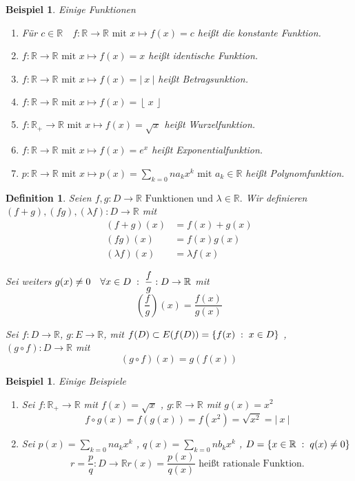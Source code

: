 \documentclass[a4paper,titlepage,oneside]{article}
\def\R{\ensuremath{\mathbb{R}} }
\def\sp{\hspace{0,1cm}}
\def\spcolon{\sp:\sp}
\newcommand{\abs}[1]{\ensuremath{\left|\:#1\:\right|}}
\newcommand{\floor}[1]{\ensuremath{\left\lfloor\:#1\:\right\rfloor}}
\newcommand{\menge}[2]{\ensuremath{\left\{#1\sp : \sp #2\right\}}}
\theoremstyle{thmstyle}
\newtheorem{defi}[satz]{Definition}
\newtheorem{bsp}[satz]{Beispiel}
\theoremstyle{subthmstyle}
\begin{document}
\begin{bsp}
Einige Funktionen
\begin{enumerate}
\item Für $ c \in \R \quad f : \R \to \R \text{ mit } x \mapsto f(x) = c $ heißt die konstante Funktion. %
\item $f : \R \to \R \text{ mit } x \mapsto f(x) = x $ heißt identische Funktion. %
\item $f : \R \to \R \text{ mit } x \mapsto f(x) = \abs{x} $ heißt Betragsunktion. %
\item $f : \R \to \R \text{ mit } x \mapsto f(x) = \floor{x} $ %
\item $f : \R_+ \to \R \text{ mit } x \mapsto f(x) = \sqrt{x} $ heißt Wurzelfunktion. %
\item $f : \R \to \R \text{ mit } x \mapsto f(x) = e^x $ heißt Exponentialfunktion. %
\item $p : \R \to \R \text{ mit } x \mapsto p(x) = \sum_{k=0}{n}{a_kx^k} \text{ mit } a_k \in \R $ heißt Polynomfunktion. %
\end{enumerate}
\end{bsp}

\begin{defi}
Seien \(f,g : D \to \R \text{ Funktionen und } \lambda \in \R.\) Wir definieren \((f+g), (fg), (\lambda f) : D \to \R \) mit
\begin{align*}
(f+g)(x) &= f(x) + g(x) \\
(fg)(x) &= f(x) g(x) \\
(\lambda f)(x) &= \lambda f(x)
\end{align*}

Sei weiters $\displaystyle g(x) \ne 0 \quad \forall x \in D \spcolon \frac{f}{g} : D \to \R $ mit
\[\left(\frac{f}{g}\right)(x) = \frac{f(x)}{g(x)}\]

Sei \( f: D \to \R\), \(g: E \to \R\), mit \(f(D) \subset E (f(D)) = \menge{f(x)}{x \in D}\) , \((g  \circ  f)  :  D \to \R\) mit
\[(g \circ f)(x) = g(f(x))\]
\end{defi}

\begin{bsp}
Einige Beispiele
\begin{enumerate}
\item Sei \(f: \R_+ \to \R\) mit \(f(x) = \sqrt{x}\) , \(g: \R \to \R\) mit \(g(x) = x^2\)
\[f \circ g(x) = f(g(x)) = f(x^2) = \sqrt{x^2} = \abs{x}\]

\item Sei \(p(x) = \sum_{k=0}{n}{a_kx^k}\) , \(q(x) = \sum_{k=0}{n}{b_kx^k}\) , \(D = \menge{x\in \R}{q(x) \ne 0}\)
 \[r = \frac{p}{q} : D \to \R r(x) = \frac{p(x)}{q(x)} \text{ heißt rationale Funktion.}\]
\end{enumerate}
\end{bsp}
\end{document}
